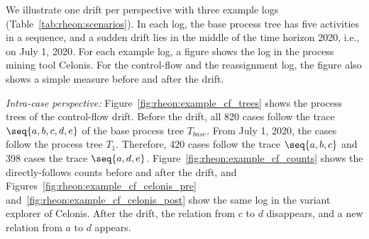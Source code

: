 We illustrate one drift per perspective with three example logs (Table~\ref{tab:rheon:scenarios}). In each log, the base process tree has five activities in a sequence, and a sudden drift lies in the middle of the time horizon 2020, i.e., on July 1, 2020. For each example log, a figure shows the log in the process mining tool Celonis. For the control-flow and the reassignment log, the figure also shows a simple measure before and after the drift.


\emph{Intra-case perspective:} Figure~\ref{fig:rheon:example_cf_trees} shows the process trees of the control-flow drift. Before the drift, all 820 cases follow the trace $\seq{a, b, c, d, e}$ of the base process tree $T_{\mathit{base}}$. From July 1, 2020, the cases follow the process tree $T_1$. Therefore, 420 cases follow the trace $\seq{a, b, c}$ and 398 cases the trace $\seq{a, d, e}$. Figure~\ref{fig:rheon:example_cf_counts} shows the directly-follows counts before and after the drift, and Figures~\ref{fig:rheon:example_cf_celonis_pre} and~\ref{fig:rheon:example_cf_celonis_post} show the same log in the variant explorer of Celonis. After the drift, the relation from $c$ to $d$ disappears, and a new relation from $a$ to $d$ appears.

